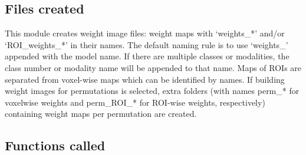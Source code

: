 \subsection{Files created}

This module creates weight image files: weight maps with `weights\_*' and/or `ROI\_weights\_*' in their names. The default naming rule is to use `weights\_' appended with the model name. If there are multiple classes or modalities, the class number or modality name will be appended to that name. Maps of ROIs are separated from voxel-wise maps which can be identified by names. If building weight images for permutations is selected, extra folders (with names perm\_* for voxelwise weights and perm\_ROI\_* for ROI-wise weights, respectively) containing weight maps per permutation are created.









\subsection{Functions called}


